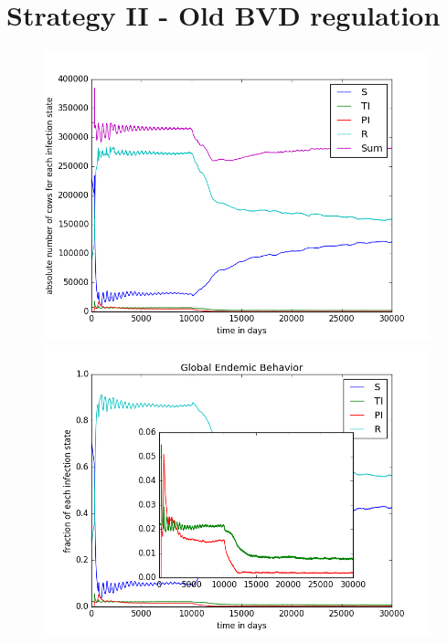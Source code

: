 \section{Strategy II - Old BVD regulation}

\begin{figure}[htbp]
\begin{minipage}{0.5\textwidth}
\centering
\noindent\includegraphics[width=0.95\linewidth,height=\textheight,
keepaspectratio]{cont2totalEndemicNumbers.png} 
\end{minipage}
\begin{minipage}{0.5\textwidth}
\centering
\noindent\includegraphics[width=0.95\linewidth,height=\textheight,
keepaspectratio]{cont2endemicFractions.png} 
\end{minipage}
\caption[Endemic Behavior in Containment Strategy One]{}
\label{fig:demographyScen8}
\end{figure}


